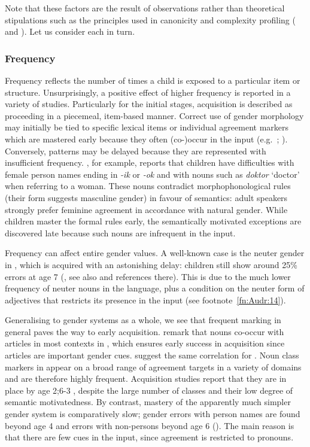 \documentclass[output=collectionpaper]{langsci/langscibook}
\begin{document}
Note that these factors are the result of observations rather than theoretical stipulations such as the principles used in canonicity and complexity profiling ( and ). Let us consider each in turn.


\subsubsection{Frequency}

Frequency reflects the number of times a child is exposed to a particular item or structure. Unsurprisingly, a positive effect of higher frequency is reported in a variety of studies. Particularly for the initial stages, acquisition is described as proceeding in a piecemeal, item-based manner. Correct use of gender morphology may initially be tied to specific lexical items or individual agreement markers which are mastered early because they often (co-)occur in the input (e.g.\ \citealt{Mariscal2009,Szagun2007}; \citealt[115]{Mills1986}). Conversely, patterns may be delayed because they are represented with insufficient frequency. \citet{Rodina2014}, for example, reports that  children have difficulties with female person names ending in \textit{-ik} or \textit{-ok} and with nouns such as \textit{doktor} `doctor' when referring to a woman. These nouns contradict morphophonological rules (their form suggests masculine gender) in favour of semantics: adult speakers strongly prefer feminine agreement in accordance with natural gender. While children master the formal rules early, the semantically motivated exceptions are discovered late because such nouns are infrequent in the input.

Frequency can affect entire gender values. A well-known case is the neuter gender in , which is acquired with an astonishing delay: children still show around 25\% errors at age 7 (\citealt{Blom2008}, see also \citealt{Keij2012} and references there). This is due to the much lower frequency of neuter nouns in the language, plus a condition on the neuter form of adjectives that restricts its presence in the input (see footnote~\ref{fn:Audr:14}).

Generalising to gender systems as a whole, we see that frequent marking in general paves the way to early acquisition. \citet{Szagun2007} remark that nouns co-occur with articles in most contexts in , which ensures early success in acquisition since articles are important gender cues. \citet{Eichler2013} suggest the same correlation for . Noun class markers in  appear on a broad range of agreement targets in a variety of domains and are therefore highly frequent. Acquisition studies report that they are in place by age 2;6-3 \citep{Demuth2003}, despite the large number of classes and their low degree of semantic motivatedness. By contrast, mastery of the apparently much simpler  gender system is comparatively slow; gender errors with person names are found beyond age 4 and errors with non-persons beyond age 6 (\citealt[91, 103]{Mills1986}). The main reason is that there are few cues in the input, since agreement is restricted to pronouns.
\end{document}
